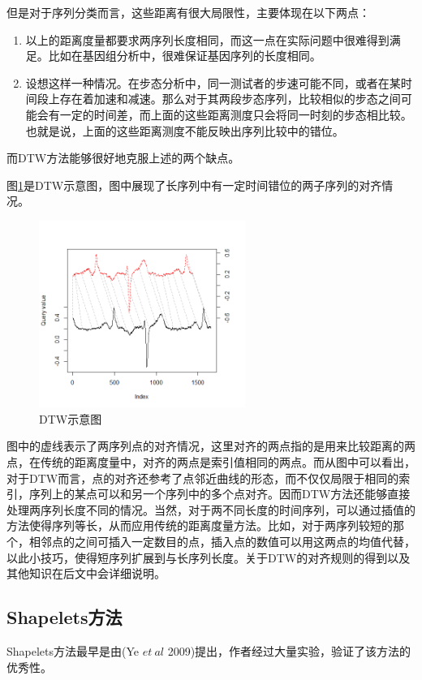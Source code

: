 但是对于序列分类而言，这些距离有很大局限性，主要体现在以下两点：
\begin{enumerate}
  \item 以上的距离度量都要求两序列长度相同，而这一点在实际问题中很难得到满足。比如在基因组分析中，很难保证基因序列的长度相同。
  \item 设想这样一种情况。在步态分析中，同一测试者的步速可能不同，或者在某时间段上存在着加速和减速。那么对于其两段步态序列，比较相似的步态之间可能会有一定的时间差，而上面的这些距离测度只会将同一时刻的步态相比较。也就是说，上面的这些距离测度不能反映出序列比较中的错位。
\end{enumerate}

而DTW方法能够很好地克服上述的两个缺点。

图\ref{fig：1}是DTW示意图，图中展现了长序列中有一定时间错位的两子序列的对齐情况\cite{Giorgino2009}。
\begin{figure}
  \centering
  \includegraphics[width=0.6\textwidth]{./figure/two_way_plot.png}
  \caption{DTW示意图}\label{fig：1}
\end{figure}

图中的虚线表示了两序列点的对齐情况，这里对齐的两点指的是用来比较距离的两点，在传统的距离度量中，对齐的两点是索引值相同的两点。而从图中可以看出，对于DTW而言，点的对齐还参考了点邻近曲线的形态，而不仅仅局限于相同的索引，序列上的某点可以和另一个序列中的多个点对齐。因而DTW方法还能够直接处理两序列长度不同的情况。当然，对于两不同长度的时间序列，可以通过插值的方法使得序列等长，从而应用传统的距离度量方法。比如，对于两序列较短的那个，相邻点的之间可插入一定数目的点，插入点的数值可以用这两点的均值代替，以此小技巧，使得短序列扩展到与长序列长度。关于DTW的对齐规则的得到以及其他知识在后文中会详细说明。

\subsection{Shapelets方法}
Shapelets方法最早是由(Ye $et~al$ 2009)提出，作者经过大量实验，验证了该方法的优秀性\cite{Shapelets_website}。

